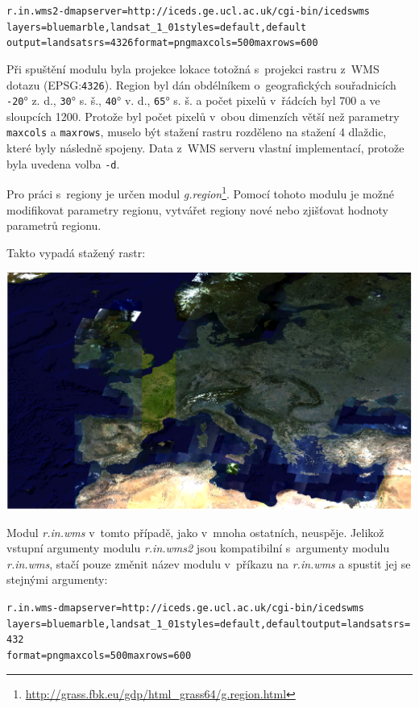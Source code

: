 \documentclass[a4paper,12pt]{article}
\begin{document}
\begin{alltt}\footnotesize
r.in.wms2 -d mapserver=http://iceds.ge.ucl.ac.uk/cgi-bin/icedswms \\ layers=bluemarble,landsat\_1\_01 styles=default,default
output=landsat srs=4326 format=png maxcols=500 maxrows=600
\end{alltt}

Při spuštění modulu byla projekce lokace totožná s~projekci rastru
z~WMS dotazu (EPSG:{\tt 4326}). Region byl dán obdélníkem o~geografických
souřadnicích {\tt -20}° z. d., {\tt 30}° s. š., {\tt 40}° v. d., {\tt 65}° s. š. a počet
pixelů v~řádcích byl 700 a ve sloupcích 1200. Protože byl počet pixelů
v~obou dimenzích větší než parametry {\tt maxcols} a {\tt maxrows}, muselo být
stažení rastru rozděleno na stažení 4 dlaždic, které byly následně
spojeny. Data z~WMS serveru vlastní implementací, protože byla 
uvedena volba {\tt -d}.

Pro práci s~regiony je určen modul \emph{g.region}\footnote{\url{http://grass.fbk.eu/gdp/html_grass64/g.region.html}}. Pomocí tohoto modulu je
možné modifikovat parametry regionu, vytvářet regiony nové nebo zjišťovat
hodnoty parametrů regionu.


Takto vypadá stažený rastr:
\begin{center}
\includegraphics[scale=0.25]{figures/GRASS_WMS_obrazek.png}
\end{center}
Modul \emph{r.in.wms} v~tomto případě, jako v~mnoha ostatních, neuspěje.
Jelikož vstupní argumenty modulu \emph{r.in.wms2} jsou kompatibilní s~argumenty
modulu \emph{r.in.wms}, stačí pouze změnit název modulu  v~příkazu 
na \emph{r.in.wms} a spustit jej 
se stejnými argumenty:
\begin{alltt}\footnotesize
r.in.wms -d mapserver=http://iceds.ge.ucl.ac.uk/cgi-bin/icedswms\\ layers=bluemarble,landsat_1_01 styles=default,default output=landsat srs=432\\ format=png maxcols=500 maxrows=600
\end{alltt}
\end{document}
